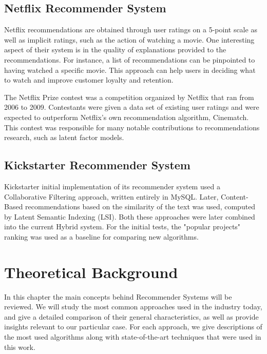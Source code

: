 \documentclass[cic,tc,english]{iiufrgs}
\begin{document}
\section{Netflix Recommender System}
Netflix recommendations are obtained through user ratings on a 5-point scale as well as implicit ratings, such as the action of watching a movie. One interesting aspect of their system is in the quality of explanations provided to the recommendations. For instance, a list of recommendations can be pinpointed to having watched a specific movie. This approach can help users in deciding what to watch and improve customer loyalty and retention.

The Netflix Prize contest was a competition organized by Netflix that ran from 2006 to 2009. Contestants were given a data set of existing user ratings and were expected to outperform Netflix's own recommendation algorithm, Cinematch. This contest was responsible for many notable contributions to recommendations research, such as latent factor models.
\section{Kickstarter Recommender System}
Kickstarter initial implementation of its recommender system used a Collaborative Filtering approach, written entirely in MySQL. Later, Content-Based recommendations based on the similarity of the text was used, computed by Latent Semantic Indexing (LSI). Both these approaches were later combined into the current Hybrid system. For the initial tests, the "popular projects" ranking was used as a baseline for comparing new algorithms.

\chapter{Theoretical Background}
In this chapter the main concepts behind Recommender Systems will be reviewed. We will study the most common approaches used in the industry today, and give a detailed comparison of their general characteristics, as well as provide insights relevant to our particular case. For each approach, we give descriptions of the most used algorithms along with state-of-the-art techniques that were used in this work.
\end{document}
